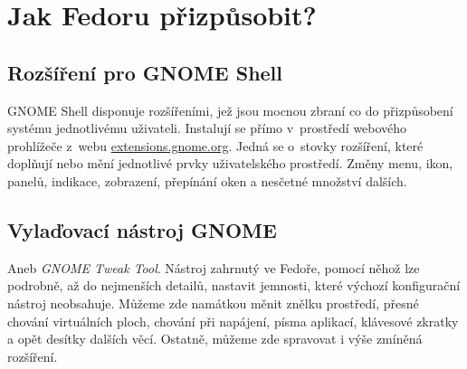 \chapter*{Jak Fedoru přizpůsobit?}

\section*{Rozšíření pro GNOME Shell}
GNOME Shell disponuje rozšířeními, jež jsou mocnou zbraní co do přizpůsobení systému jednotlivému uživateli. Instalují se přímo v~prostředí webového prohlížeče z~webu \url{extensions.gnome.org}. Jedná se o~stovky rozšíření, které doplňují nebo mění jednotlivé prvky uživatelského prostředí. Změny menu, ikon, panelů, indikace, zobrazení, přepínání oken a nesčetné množství dalších.

\section*{Vylaďovací nástroj GNOME}
Aneb \emph{GNOME Tweak Tool}. Nástroj zahrnutý ve Fedoře, pomocí něhož lze podrobně, až do nejmenších detailů, nastavit jemnosti, které výchozí konfigurační nástroj neobsahuje. Můžeme zde namátkou měnit znělku prostředí, přesné chování virtuálních ploch, chování při napájení, písma aplikací, klávesové zkratky a opět desítky dalších věcí. Ostatně, můžeme zde spravovat i výše zmíněná rozšíření.
